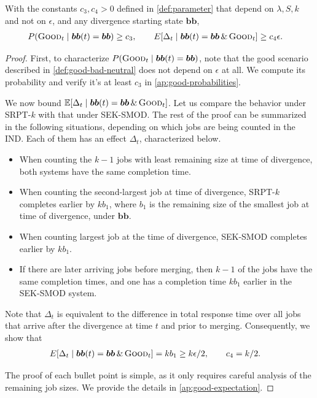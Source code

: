 \documentclass[acmsmall]{acmart}
\newcommand{\E}[1]{\mathbb{E}[#1]}
\newcommand{\bb}{\boldsymbol{b}}
\newcommand{\bbb}{\bb\bb}
\newcommand{\good}{\textsc{Good}}
\begin{document}
\begin{lemma}
    \label{lem:good}
    With the constants $c_3, c_4 > 0$ defined in \cref{def:parameter} that depend on $\lambda, S, k$ and not on $\epsilon$, and any divergence starting state $\bbb$,
    \begin{align*}
        P(\good_t \mid \bbb(t) = \bbb) &\ge c_3, \qquad
        E[\Delta_t \mid \bbb(t) = \bbb \,\&\, \good_t] \ge c_4 \epsilon.
    \end{align*}
\end{lemma}
\begin{proof}
    First, to characterize $P(\good_t \mid \bbb(t) = \bbb)$,
    note that the good scenario described in \cref{def:good-bad-neutral}
    does not depend on $\epsilon$ at all.
    We compute its probability and verify it's at least $c_3$ in \cref{ap:good-probabilities}.
    
    We now bound $\E{\Delta_t \mid \bbb(t) = \bbb \,\&\, \good_t}$.
    Let us compare the behavior under SRPT-$k$ with that under SEK-SMOD. 
    The rest of the proof can be summarized in the following situations, depending on which jobs are being counted in the IND. Each of them has an effect $\Delta_t$, characterized below.
    \begin{itemize}
        \item When counting the $k-1$ jobs with least remaining size at time of divergence, both systems have the same completion time.
        \item When counting the second-largest job at time of divergence, SRPT-$k$ completes earlier by $k b_1$, where $b_1$ is the remaining size of the smallest job at time of divergence, under $\bbb$.
        \item When counting largest job at the time of divergence, SEK-SMOD completes earlier by $k b_1$.
        \item If there are later arriving jobs before merging, then $k-1$ of the jobs have the same completion times,
        and one has a completion time $k b_1$ earlier in the SEK-SMOD system.
    \end{itemize}
    Note that $\Delta_t$ is equivalent to the difference in total response time over all jobs that arrive after the divergence at time $t$ and prior to merging. Consequently, we show that
    \begin{align*}
        E[\Delta_t \mid \bbb(t) = \bbb \,\&\, \good_t] &= k b_1 \ge k \epsilon/2, \qquad c_4 = k/2.
    \end{align*}

    The proof of each bullet point is simple, as it only requires careful analysis of the remaining job sizes. We provide the details in \cref{ap:good-expectation}.
\end{proof}
\end{document}

